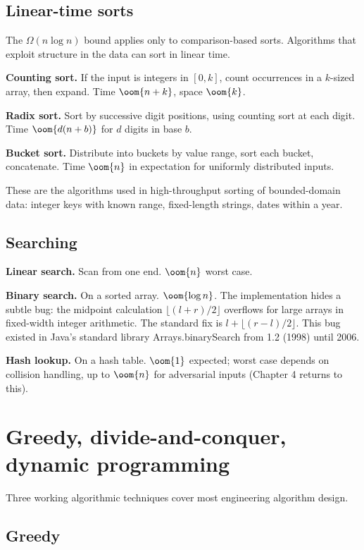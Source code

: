 \subsection{Linear-time sorts}

The $\Omega(n \log n)$ bound applies only to comparison-based sorts. Algorithms that exploit structure in the data can sort in linear time.

\textbf{Counting sort.} If the input is integers in $[0, k]$, count occurrences in a $k$-sized array, then expand. Time $\oom{n + k}$, space $\oom{k}$.

\textbf{Radix sort.} Sort by successive digit positions, using counting sort at each digit. Time $\oom{d(n + b)}$ for $d$ digits in base $b$.

\textbf{Bucket sort.} Distribute into buckets by value range, sort each bucket, concatenate. Time $\oom{n}$ in expectation for uniformly distributed inputs.

These are the algorithms used in high-throughput sorting of bounded-domain data: integer keys with known range, fixed-length strings, dates within a year.

\subsection{Searching}

\textbf{Linear search.} Scan from one end. $\oom{n}$ worst case.

\textbf{Binary search.} On a sorted array. $\oom{\log n}$. The implementation hides a subtle bug: the midpoint calculation $\lfloor (l + r) / 2 \rfloor$ overflows for large arrays in fixed-width integer arithmetic. The standard fix is $l + \lfloor (r - l) / 2 \rfloor$. This bug existed in Java's standard library Arrays.binarySearch from 1.2 (1998) until 2006.

\textbf{Hash lookup.} On a hash table. $\oom{1}$ expected; worst case depends on collision handling, up to $\oom{n}$ for adversarial inputs (Chapter 4 returns to this).

\section{Greedy, divide-and-conquer, dynamic programming}

Three working algorithmic techniques cover most engineering algorithm design.

\subsection{Greedy}

